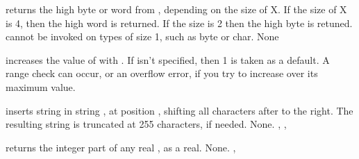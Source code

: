 \documentclass{report}
\begin{document}


{ returns the high byte or word from , depending on the size
of X. If the size of X is 4, then the high word is returned. If the size is
2 then the high byte is retuned. 
 cannot be invoked on types of size 1, such as byte or char.}
{None}
{}



{ increases the value of  with .
If  isn't specified, then 1 is taken as a default.}
{A range check can occur, or an overflow error, if you try to increase 
over its maximum value.}
{}



{ inserts string  in string , at position
, shifting all characters after  to the right. The
resulting string is truncated at 255 characters, if needed.}
{None.}
{, , }



{ returns the integer part of any real , as a real.}
{None.}
{, }


\end{document}
